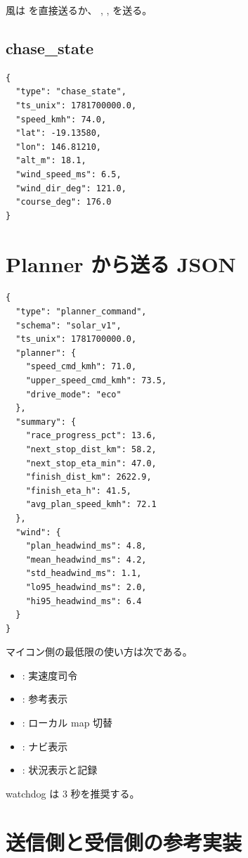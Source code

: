 \documentclass[a4paper,11pt]{article}
\begin{document}
風は  を直接送るか、
, ,  を送る。

\subsection{chase\_state}

\begin{Verbatim}[fontsize=\scriptsize]
{
  "type": "chase_state",
  "ts_unix": 1781700000.0,
  "speed_kmh": 74.0,
  "lat": -19.13580,
  "lon": 146.81210,
  "alt_m": 18.1,
  "wind_speed_ms": 6.5,
  "wind_dir_deg": 121.0,
  "course_deg": 176.0
}
\end{Verbatim}

\section{Planner から送る JSON}

\begin{Verbatim}[fontsize=\scriptsize]
{
  "type": "planner_command",
  "schema": "solar_v1",
  "ts_unix": 1781700000.0,
  "planner": {
    "speed_cmd_kmh": 71.0,
    "upper_speed_cmd_kmh": 73.5,
    "drive_mode": "eco"
  },
  "summary": {
    "race_progress_pct": 13.6,
    "next_stop_dist_km": 58.2,
    "next_stop_eta_min": 47.0,
    "finish_dist_km": 2622.9,
    "finish_eta_h": 41.5,
    "avg_plan_speed_kmh": 72.1
  },
  "wind": {
    "plan_headwind_ms": 4.8,
    "mean_headwind_ms": 4.2,
    "std_headwind_ms": 1.1,
    "lo95_headwind_ms": 2.0,
    "hi95_headwind_ms": 6.4
  }
}
\end{Verbatim}

マイコン側の最低限の使い方は次である。

\begin{itemize}
  \item {}: 実速度司令
  \item {}: 参考表示
  \item {}: ローカル map 切替
  \item {}: ナビ表示
  \item {}: 状況表示と記録
\end{itemize}

watchdog は 3 秒を推奨する。

\section{送信側と受信側の参考実装}
\end{document}
